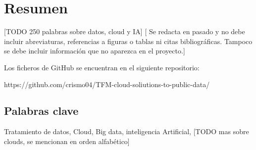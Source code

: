 \chapter*{Resumen}
 [TODO 250 palabras sobre datos, cloud y IA]
[ Se redacta en pasado y no debe incluir abreviaturas, referencias a figuras o tablas ni citas
bibliográficas. Tampoco se debe incluir información que no aparezca en el proyecto.]


Los ficheros de GitHub se encuentran en el siguiente repositorio: 

	https://github.com/crismo04/TFM-cloud-soliutions-to-public-data/
	
\section*{Palabras clave}
   
\noindent Tratamiento de datos, Cloud, Big data, inteligencia Artificial, [TODO mas sobre clouds, se mencionan en orden alfabético]

   


